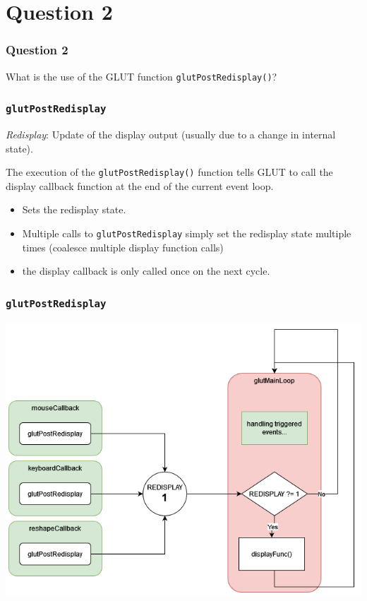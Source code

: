 \documentclass{beamer}
\begin{document}
\section{Question 2}

\begin{frame}
    \frametitle{Question 2}

    What is the use of the GLUT function \texttt{glutPostRedisplay()}?

\end{frame}

\begin{frame}
    \frametitle{\texttt{glutPostRedisplay}}

    \begin{tcolorbox}
        \textit{Redisplay}: Update of the display output (usually due to a change in internal state).
    \end{tcolorbox}

    The execution of the \texttt{glutPostRedisplay()} function tells GLUT to call the 
    display callback function at the end of the current event loop. \\

    \begin{itemize}
        \item Sets the redisplay state.
        \item Multiple calls to \texttt{glutPostRedisplay} simply set the redisplay state multiple times (coalesce multiple display function calls)
        \item the display callback is only called once on the next cycle.
    \end{itemize}

\end{frame}

\begin{frame}
    \frametitle{\texttt{glutPostRedisplay}}

    \begin{center}
        \includegraphics[scale=0.3]{images/glutPostRedisplay.png}
    \end{center}

\end{frame}
\end{document}
